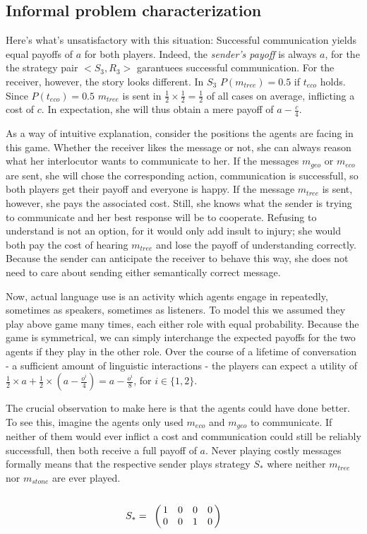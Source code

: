 \documentclass[10]{article}
\begin{document}
\subsection{Informal problem characterization}
Here's what's unsatisfactory with this situation: Successful communication yields equal payoffs of $a$ for both players. Indeed, the \textit{sender's payoff} is always $a$, for the the strategy pair $<S_3,R_3>$ garantuees successful communication. For the receiver, however, the story looks different. In $S_3$ $P(m_{tree})=0.5$ if $t_{eco}$ holds. Since $P(t_{eco})=0.5$ $m_{tree}$ is sent in $\tfrac{1}{2}\times \tfrac{1}{2} = \tfrac{1}{2}$ of all cases on average, inflicting a cost of $c$. In expectation, she will thus obtain a mere payoff of $a-\tfrac{c}{4}$.

As a way of intuitive explanation, consider the positions the agents are facing in this game. Whether the receiver likes the message or not, she can always reason what her interlocutor wants to communicate to her. If the messages $m_{geo}$ or $m_{eco}$ are sent, she will chose the corresponding action, communication is successfull, so both players get their payoff and everyone is happy. If the message $m_{tree}$ is sent, however, she pays the associated cost. Still, she knows what the sender is trying to communicate and her best response will be to cooperate. Refusing to understand is not an option, for it would only add insult to injury; she would both pay the cost of hearing $m_{tree}$ and lose the payoff of understanding correctly. Because the sender can anticipate the receiver to behave this way, she does not need to care about sending either semantically correct message.

Now, actual language use is an activity which agents engage in repeatedly, sometimes as speakers, sometimes as listeners. To model this we assumed they play above game many times, each either role with equal probability. Because the game is symmetrical, we can simply interchange the expected payoffs for the two agents if they play in the other role. Over the course of a lifetime of conversation - a sufficient amount of linguistic interactions - the players can expect a utility of $\tfrac{1}{2}\times a + \tfrac{1}{2}\times (a-\tfrac{o^i}{4})=a-\tfrac{o^i}{8}$, for $i\in \{1,2\}$. 
 
The crucial observation to make here is that the agents could have done better. To see this, imagine the agents only used $m_{eco}$ and $m_{geo}$ to communicate. If neither of them would ever inflict a cost and communication could still be reliably successfull, then both receive a full payoff of $a$.
Never playing costly messages formally means that the respective sender plays strategy $S_*$ where neither $m_{tree}$ nor $m_{stone}$ are ever played. 
\begin{equation*}
S_*=
\bordermatrix{
            & & & &    \cr
 &       1 &    0      & 0       & 0 \cr
 &       0 &         0 & 1      & 0
 }\qquad
\end{equation*}
\end{document}
